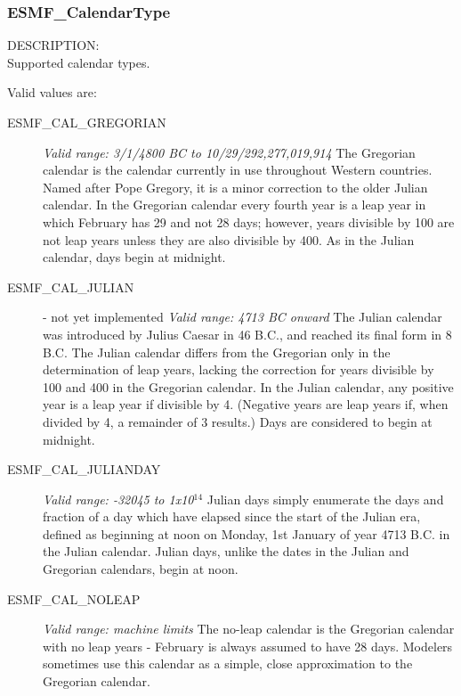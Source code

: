 
\subsubsection{ESMF\_CalendarType}

{\sf DESCRIPTION:\\}
Supported calendar types.

Valid values are:
\begin{description}
      
\item [ESMF\_CAL\_GREGORIAN] 
{\it Valid range: 3/1/4800 BC to 10/29/292,277,019,914 }
\newline The Gregorian calendar is the calendar currently in use 
throughout Western
countries.  Named after Pope Gregory, it is a minor 
correction to the older Julian calendar. In the Gregorian calendar every
fourth year is a leap year in which February has 29 and not 28 days;
however, years divisible by 100 are not leap years unless they are also 
divisible  by 400.  As in the Julian calendar, days begin at midnight.

\item [ESMF\_CAL\_JULIAN] - not yet implemented 
{\it Valid range: 4713 BC onward} 
\newline The Julian calendar was introduced by Julius Caesar in 46 B.C., and 
reached its final form in 8 B.C.  The Julian calendar differs from the 
Gregorian only in the determination of leap years, lacking the correction 
for years divisible
by 100 and 400 in the Gregorian calendar. In the Julian calendar, any positive 
year is a leap year if divisible by 4. (Negative years are leap years if, when 
divided by 4, a remainder of 3 results.) Days are considered to begin at 
midnight.

\item [ESMF\_CAL\_JULIANDAY] 
{\it Valid range: -32045 to 1x10$^{14}$} 
\newline Julian days simply enumerate the days and fraction of a day which have elapsed 
since the start of the Julian era, defined as beginning at noon on Monday, 
1st January of year 4713 B.C. in the Julian calendar.  Julian days, 
unlike the dates in the Julian and Gregorian calendars, begin at noon.

\item [ESMF\_CAL\_NOLEAP]
{\it Valid range: machine limits} 
\newline The no-leap calendar is the Gregorian calendar with no leap years - 
February is always assumed to have 28 days.  Modelers sometimes use this 
calendar as a simple, close approximation to the Gregorian calendar.


\end{description}
